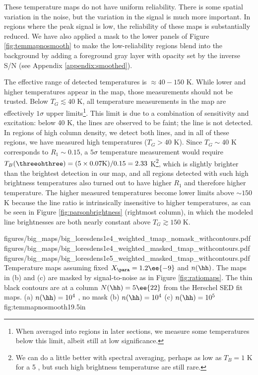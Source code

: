 
These temperature maps do not have uniform reliability.  There is some spatial
variation in the noise, but the variation in the signal is much more important.
In regions where the peak signal is low, the reliability of these maps is
substantially reduced.  We have also applied a mask to the lower panels of
Figure \ref{fig:temmapnosmooth} to make the low-reliability regions blend into
the background by adding a foreground gray layer with opacity set by the
inverse S/N (see Appendix \ref{appendix:smoothed}).

The effective range of detected temperatures is $\approx40-150$ K. While lower
and higher temperatures appear in the map, those measurements should not be
trusted.  Below $T_G\lesssim40$ K, all temperature measurements in the map are
effectively $1\sigma$ upper limits\footnote{When averaged into regions in later
sections, we measure some temperatures below this limit, albeit still at low
significance.}.  This
limit is due to a combination of sensitivity and excitation: below 40 K, the
\para lines are observed to be faint; the \threetwoone line is not detected.
In regions of high column density, we detect both lines, and in all of these
regions, we have measured high temperatures ($T_G>40$ K).  
Since $T_G\sim40$ K corresponds to $R_1\sim0.15$, a $5\sigma$ temperature
measurement would require $T_B(\threeohthree) = (5 \times 0.07 \mathrm{K}) /
0.15 = 2.33$ K\footnote{We can do a little better with spectral averaging,
perhaps as low as $T_B=1$ K for a 5 \kms, but such high brightness temperaturse
are still rare.}, which is slightly brighter than the brightest detection in our map,
and all regions detected with such high brightness
temperatures also turned out to have higher $R_1$ and therefore higher
temperature.
The higher measured temperatures
become lower limits above $\sim150$ K because the \para line ratio is
intrinsically insensitive to higher temperatures, as can be seen in Figure
\ref{fig:parsonbrightness} (rightmost column), in which the modeled line
brightnesses are both nearly constant above $T_G\gtrsim150$ K.


\RotFigureThreeAA
{figures/big_maps/big_loresdens1e4_weighted_tmap_nomask_withcontours.pdf}
{figures/big_maps/big_loresdens1e4_weighted_masked_tmap_withcontours.pdf}
{figures/big_maps/big_loresdens1e5_weighted_masked_tmap_withcontours.pdf}
{Temperature maps assuming fixed $X_{\para}=1.2\ee{-9}$
and $n(\hh)$.  The maps in (b) and (c) are masked by signal-to-noise as in
Figure \ref{fig:ratiomaps}.  The thin black contours are at a column
$N(\hh)=5\ee{22}$ \percc
from the Herschel SED fit maps.
(a) $n(\hh) = 10^4$ \percc, no mask
(b) $n(\hh) = 10^4$ \percc
(c) $n(\hh) = 10^5$ \percc
}
{fig:temmapnosmooth}{1}{9.5in}





